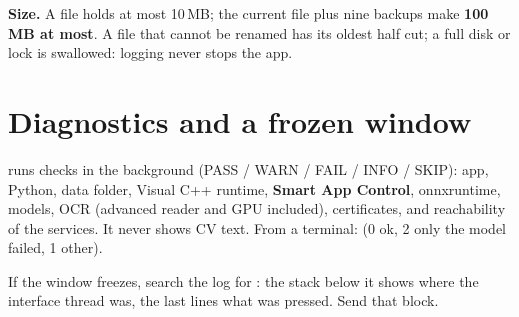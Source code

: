 \textbf{Size.} A file holds at most 10\,MB; the current file plus nine backups make \textbf{100\,MB at most}. A file
that cannot be renamed has its oldest half cut; a full disk or lock is swallowed: logging never stops the app.

\section{Diagnostics and a frozen window}
 runs checks in the background (PASS / WARN / FAIL / INFO /
SKIP): app, Python, data folder, Visual C++ runtime, \textbf{Smart App Control}, onnxruntime,
models, OCR (advanced reader and GPU included), certificates, and reachability of the services. It never shows CV text. From a terminal:
 (0 ok, 2 only the model failed, 1 other).

\begin{okbox}
If the window freezes, search the log for : the stack below it shows where the
interface thread was, the last  lines what was pressed. Send that block.
\end{okbox}
